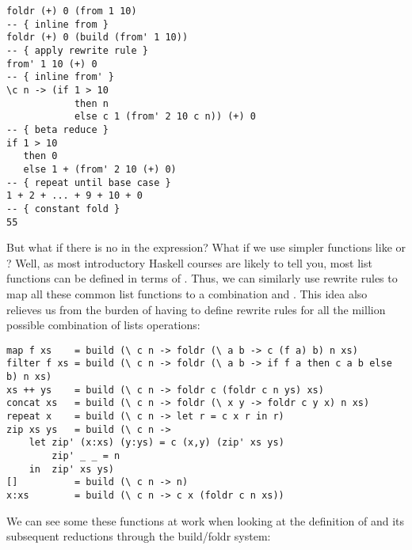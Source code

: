 \begin{listing}[H]
\begin{verbatim}
foldr (+) 0 (from 1 10)
-- { inline from }
foldr (+) 0 (build (from' 1 10))
-- { apply rewrite rule }
from' 1 10 (+) 0
-- { inline from' }
\c n -> (if 1 > 10
            then n
            else c 1 (from' 2 10 c n)) (+) 0
-- { beta reduce }
if 1 > 10
   then 0
   else 1 + (from' 2 10 (+) 0)
-- { repeat until base case }
1 + 2 + ... + 9 + 10 + 0
-- { constant fold }
55
\end{verbatim}
\end{listing}

But what if there is no  in the expression? What if we use simpler functions like  or ?
Well, as most introductory Haskell courses are likely to tell you, most list functions can be defined in terms of .
Thus, we can similarly use rewrite rules to map all these common list functions to a combination  and .
This idea also relieves us from the burden of having to define rewrite rules for all the million possible 
combination of lists operations:

\begin{listing}[H]
\begin{verbatim}
map f xs    = build (\ c n -> foldr (\ a b -> c (f a) b) n xs)
filter f xs = build (\ c n -> foldr (\ a b -> if f a then c a b else b) n xs)
xs ++ ys    = build (\ c n -> foldr c (foldr c n ys) xs)
concat xs   = build (\ c n -> foldr (\ x y -> foldr c y x) n xs)
repeat x    = build (\ c n -> let r = c x r in r)
zip xs ys   = build (\ c n -> 
    let zip' (x:xs) (y:ys) = c (x,y) (zip' xs ys)
        zip' _ _ = n
    in  zip' xs ys)
[]          = build (\ c n -> n)
x:xs        = build (\ c n -> c x (foldr c n xs))
\end{verbatim}
\end{listing}

We can see some these functions at work when looking at the definition of  and its subsequent
reductions through the build/foldr system:

